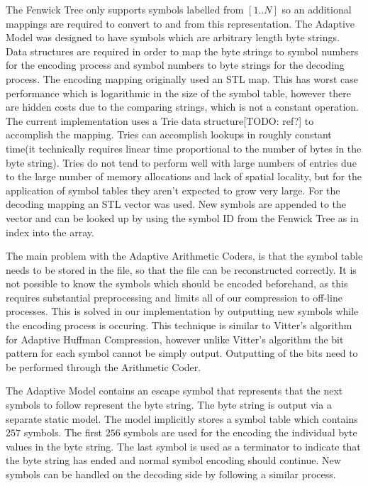 \documentclass[a4paper,11pt]{report}
\begin{document}
The Fenwick Tree only supports symbols labelled from $[1..N]$ so an additional mappings are required to convert to and from this representation. The Adaptive Model was designed to have symbols which are arbitrary length byte strings. Data structures are required in order to map the byte strings to symbol numbers for the encoding process and symbol numbers to byte strings for the decoding process. The encoding mapping originally used an STL map. This has worst case performance which is logarithmic in the size of the symbol table, however there are hidden costs due to the comparing strings, which is not a constant operation. The current implementation uses a Trie data structure[TODO: ref?] to accomplish the mapping. Tries can accomplish lookups in roughly constant time(it technically requires linear time proportional to the number of bytes in the byte string). Tries do not tend to perform well with large numbers of entries due to the large number of memory allocations and lack of spatial locality, but for the application of symbol tables they aren't expected to grow very large. For the decoding mapping an STL vector was used. New symbols are appended to the vector and can be looked up by using the symbol ID from the Fenwick Tree as in index into the array.

The main problem with the Adaptive Arithmetic Coders, is that the symbol table needs to be stored in the file, so that the file can be reconstructed correctly. It is not possible to know the symbols which should be encoded beforehand, as this requires substantial preprocessing and limits all of our compression to off-line processes. This is solved in our implementation by outputting new symbols while the encoding process is occuring. This technique is similar to Vitter's algorithm for Adaptive Huffman Compression, however unlike Vitter's algorithm the bit pattern for each symbol cannot be simply output. Outputting of the bits need to be performed through the Arithmetic Coder. 

The Adaptive Model contains an escape symbol that represents that the next symbols to follow represent the byte string. The byte string is output via a separate static model. The model implicitly stores a symbol table which contains $257$ symbols. The first $256$ symbols are used for the encoding the individual byte values in the byte string. The last symbol is used as a terminator to indicate that the byte string has ended and normal symbol encoding should continue. New symbols can be handled on the decoding side by following a similar process.
\end{document}
